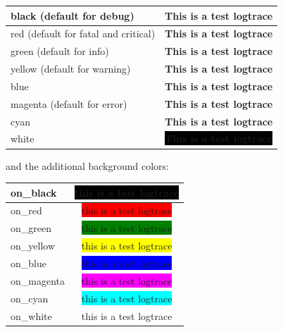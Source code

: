 \begin{center}
\begin{tabular}{|l || c|}
\hline
 black (default for debug) & {\color{black} \textbf{This is a test logtrace}} \\ 
\hline
 red (default for fatal and critical) & {\color{red} \textbf{This is a test logtrace}} \\ 
\hline
 green (default for info) & {\color{green} \textbf{This is a test logtrace}} \\ 
\hline
yellow (default for warning) & {\color{yellow} \textbf{This is a test logtrace}} \\ 
\hline
 blue & {\color{blue} \textbf{This is a test logtrace}} \\ 
\hline 
magenta (default for error) & {\color{magenta} \textbf{This is a test logtrace}} \\ 
\hline
 cyan & {\color{cyan} \textbf{This is a test logtrace}} \\ 
\hline 
white & \colorbox{black}{\color{white}\textbf{This is a test logtrace}} \\
\hline
\end{tabular}
\end{center}

and the additional background colors:
\begin{center}
\begin{tabular}{|l | c |}
  \hline
 on\_black & \colorbox{black}{\color{green}this is a test logtrace} \\
 \hline
 on\_red & \colorbox{red}{this is a test logtrace} \\
 \hline
on\_green & \colorbox{green}{this is a test logtrace} \\
 \hline
on\_yellow & \colorbox{yellow}{this is a test logtrace} \\
 \hline
 on\_blue & \colorbox{blue}{this is a test logtrace} \\
 \hline
 on\_magenta & \colorbox{magenta}{this is a test logtrace} \\
 \hline 
on\_cyan & \colorbox{cyan}{this is a test logtrace} \\
 \hline 
on\_white & \colorbox{white}{this is a test logtrace} \\
\hline
\end{tabular}
\end{center}

